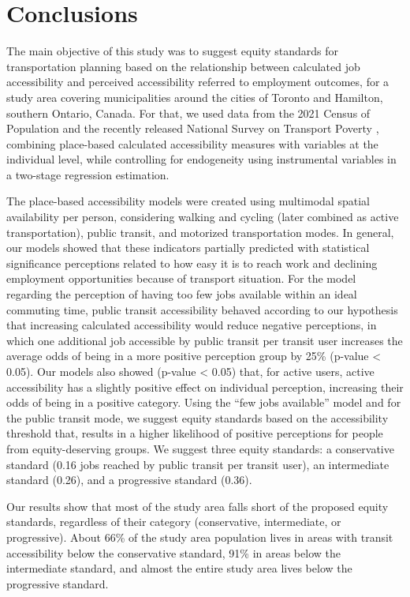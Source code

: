 \documentclass[preprint, 3p,
authoryear]{elsarticle} %
\begin{document}
\section{Conclusions}\label{conclusions}

The main objective of this study was to suggest equity standards for
transportation planning based on the relationship between calculated job
accessibility and perceived accessibility referred to employment
outcomes, for a study area covering municipalities around the cities of
Toronto and Hamilton, southern Ontario, Canada. For that, we used data
from the 2021 Census of Population and the recently released National
Survey on Transport Poverty \citep{tiznado-aitken}, combining
place-based calculated accessibility measures with variables at the
individual level, while controlling for endogeneity using instrumental
variables in a two-stage regression estimation.

The place-based accessibility models were created using multimodal
spatial availability per person, considering walking and cycling (later
combined as active transportation), public transit, and motorized
transportation modes. In general, our models showed that these
indicators partially predicted with statistical significance perceptions
related to how easy it is to reach work and declining employment
opportunities because of transport situation. For the model regarding
the perception of having too few jobs available within an ideal
commuting time, public transit accessibility behaved according to our
hypothesis that increasing calculated accessibility would reduce
negative perceptions, in which one additional job accessible by public
transit per transit user increases the average odds of being in a more
positive perception group by 25\% (p-value \textless{} 0.05). Our models
also showed (p-value \textless{} 0.05) that, for active users, active
accessibility has a slightly positive effect on individual perception,
increasing their odds of being in a positive category. Using the ``few
jobs available'' model and for the public transit mode, we suggest
equity standards based on the accessibility threshold that, results in a
higher likelihood of positive perceptions for people from
equity-deserving groups. We suggest three equity standards: a
conservative standard (0.16 jobs reached by public transit per transit
user), an intermediate standard (0.26), and a progressive standard
(0.36).

Our results show that most of the study area falls short of the proposed
equity standards, regardless of their category (conservative,
intermediate, or progressive). About 66\% of the study area population
lives in areas with transit accessibility below the conservative
standard, 91\% in areas below the intermediate standard, and almost the
entire study area lives below the progressive standard.
\end{document}
